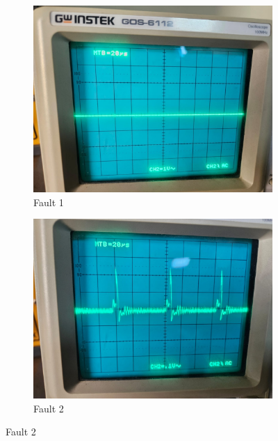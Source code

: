 \documentclass[a4paper,12pt]{article}
\begin{document}
\begin{figure}[H]
	\centering
	\begin{subfigure}[t]{0.44\textwidth}
		\centering
		\includegraphics[width=1\linewidth]{Images/1.1}
		\caption{Fault 1}
		\vspace{0.1cm}
	\end{subfigure}
	\hfil
	\begin{subfigure}[t]{0.44\textwidth}
		\centering
		\includegraphics[width=1\linewidth]{Images/1.2}
		\caption{Fault 2}
		\vspace{0.1cm}
	\end{subfigure}
	

\end{figure}
\end{document}
